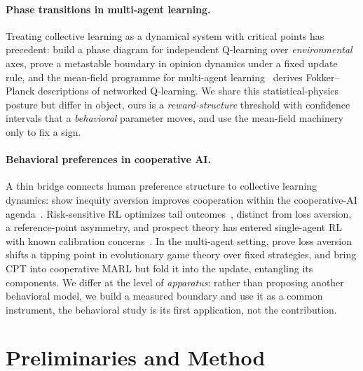 \documentclass[letterpaper]{article} %
\theoremstyle{plain}
\begin{document}
\paragraph{Phase transitions in multi-agent learning.}
Treating collective learning as a dynamical system with critical points has
precedent: \citet{yamaguchi2025} build a phase diagram for independent Q-learning over
\emph{environmental} axes, \citet{capannoli2026phase} prove a metastable boundary in opinion
dynamics under a fixed update rule, and the mean-field programme for multi-agent
learning~\citep{barfuss2019deterministic,hu2019meanfield,hussain2025convergence} derives
Fokker--Planck descriptions of networked Q-learning. We share this statistical-physics posture but
differ in object, ours is a \emph{reward-structure} threshold with confidence intervals that a
\emph{behavioral} parameter moves, and use the mean-field machinery only to fix a sign.

\paragraph{Behavioral preferences in cooperative AI.}
A thin bridge connects human preference structure to collective learning dynamics:
\citet{hughes2018inequity} show inequity aversion improves cooperation within the cooperative-AI
agenda~\citep{dafoe2020open,hammond2025multiagent,barfuss2020caring}. Risk-sensitive RL optimizes
tail outcomes~\citep{qiu2021rmix,xie2023riskq,prashanth2014cvar,tamar2015optimizing}, distinct from
loss aversion, a reference-point asymmetry, and prospect theory has entered single-agent RL with
known calibration concerns~\citep{prashanth2016cumulative,rabin2000risk,tversky1992}. In the
multi-agent setting, \citet{mengesha2025} prove loss aversion shifts a tipping point in evolutionary
game theory over fixed strategies, and \citet{lalmohammed2025} bring CPT into cooperative MARL but
fold it into the update, entangling its components. We differ at the level of \emph{apparatus}:
rather than proposing another behavioral model, we build a measured boundary and use it as a common
instrument, the behavioral study is its first application, not the contribution.

\section{Preliminaries and Method}
\label{sec:method}
\end{document}
